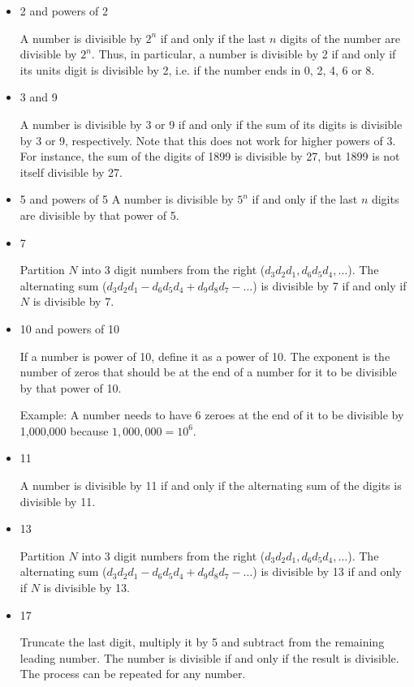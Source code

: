 \begin{itemize}
\item 2 and powers of 2

A number is divisible by $2^n$ if and only if the last $n$ digits of the number are divisible by $2^n$. Thus, in particular, a number is divisible by 2 if and only if its units digit is divisible by 2, i.e. if the number ends in 0, 2, 4, 6 or 8.

\item 3 and 9

A number is divisible by 3 or 9 if and only if the sum of its digits is divisible by 3 or 9, respectively. Note that this does not work for higher powers of 3. For instance, the sum of the digits of 1899 is divisible by 27, but 1899 is not itself divisible by 27.

\item 5 and powers of 5
A number is divisible by $5^n$ if and only if the last $n$ digits are divisible by that power of 5.

\item 7

Partition $N$ into 3 digit numbers from the right ($d_3d_2d_1,d_6d_5d_4,\dots$). The alternating sum ($d_3d_2d_1 - d_6d_5d_4 + d_9d_8d_7 - \dots$) is divisible by 7 if and only if $N$ is divisible by 7.

\item 10 and powers of 10

If a number is power of 10, define it as a power of 10. The exponent is the number of zeros that should be at the end of a number for it to be divisible by that power of 10.

Example: A number needs to have 6 zeroes at the end of it to be divisible by 1,000,000 because $1,000,000=10^6$.

\item 11

A number is divisible by 11 if and only if the alternating sum of the digits is divisible by 11.

\item 13

Partition $N$ into 3 digit numbers from the right ($d_3d_2d_1,d_6d_5d_4,\dots$). The alternating sum ($d_3d_2d_1 - d_6d_5d_4 + d_9d_8d_7 - \dots$) is divisible by 13 if and only if $N$ is divisible by 13.

\item 17

Truncate the last digit, multiply it by 5 and subtract from the remaining leading number. The number is divisible if and only if the result is divisible. The process can be repeated for any number.


\end{itemize}
